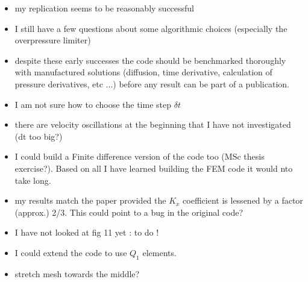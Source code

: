 \begin{itemize}
\item my replication seems to be reasonably successful
\item I still have a few questions about some algorithmic choices (especially the 
overpressure limiter)
\item despite these early successes the code should be benchmarked thoroughly 
with manufactured solutions (diffusion, time derivative, calculation 
of pressure derivatives, etc ...) before any result can be part of a publication. 
\item I am not sure how to choose the time step $\delta t$
\item there are velocity oscillations at the beginning that I have not investigated (dt too big?)
\item I could build a Finite difference version of the code too (MSc thesis exercise?).
Based on all I have learned building the FEM code it would nto take long.
\item my results match the paper provided the $K_x$ coefficient is lessened by a factor (approx.) 2/3.
This could point to a bug in the original code?
\item I have not looked at fig 11 yet : to do !
\item I could extend the code to use $Q_1$ elements.
\item stretch mesh towards the middle?
\end{itemize} 



